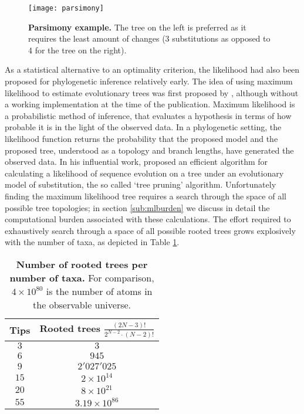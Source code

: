 \begin{figure}[h!]
\centering
\texttt{[image: parsimony]} 
\caption{
{ \footnotesize 
{\bf Parsimony example.} The tree on the left is preferred as it requires the least amount of changes (3 substitutions as opposed to 4 for the tree on the right).
}%
}
\label{fig:parsimony}
\end{figure}

As a statistical alternative to an optimality criterion, the likelihood had also been proposed for phylogenetic inference relatively early.
The idea of using maximum likelihood to estimate evolutionary trees was first proposed by \cite{Edwards1964}, although without a working implementation at the time of the publication.
Maximum likelihood is a probabilistic method of inference, that evaluates a hypothesis in terms of how probable it is in the light of the observed data.
In a phylogenetic setting, the likelihood function returns the probability that the proposed model and the proposed tree, understood as a topology and branch lengths, have generated the observed data.
In his influential work, \cite{Felsenstein1981} proposed an efficient algorithm for calculating a likelihood of sequence evolution on a tree under an evolutionary model of substitution, the so called `tree pruning' algorithm.
Unfortunately finding the maximum likelihood tree requires a search through the space of all possible tree topologies; in section \ref{sub:mlburden} we discuss in detail the computational burden associated with these calculations.
The effort required to exhaustively search through a space of all possible rooted trees grows explosively with the number of taxa, as depicted in Table \ref{tab:maxLikeBurden}.

\begin{table}[h!]
\centering
\begin{tabular}{cc}
\hline 
Tips & Rooted trees $\frac{(2N-3)!}{2^{N-2}\cdot(N-2)!}$ \tabularnewline
\hline 
\rowcolor{gray1}
$3$ & $3$\tabularnewline
$6$ & $945$\tabularnewline
\rowcolor{gray1}
$9$ & $2'027'025$\tabularnewline
$15$ & $2\times10^{14}$\tabularnewline
\rowcolor{gray1}
$20$ & $8\times10^{21}$\tabularnewline
$55$ & $3.19\times10^{86}$\tabularnewline
\end{tabular}
\caption{
{ \footnotesize 
{\bf{Number of rooted trees per number of taxa.}} For comparison, $4 \times 10^{80} $ is the number of atoms in the observable universe.
}%
}
\label{tab:maxLikeBurden}
\end{table}

